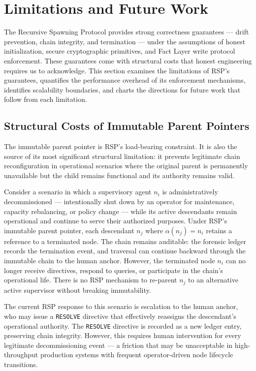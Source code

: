 \section{Limitations and Future Work}
\label{sec:rs-limitations}

The Recursive Spawning Protocol provides strong correctness guarantees — drift prevention, chain integrity, and termination — under the assumptions of honest initialization, secure cryptographic primitives, and Fact Layer write protocol enforcement. These guarantees come with structural costs that honest engineering requires us to acknowledge. This section examines the limitations of RSP's guarantees, quantifies the performance overhead of its enforcement mechanisms, identifies scalability boundaries, and charts the directions for future work that follow from each limitation.

\subsection{Structural Costs of Immutable Parent Pointers}
\label{sec:rs-limitations-immutability}

The immutable parent pointer is RSP's load-bearing constraint. It is also the source of its most significant structural limitation: it prevents legitimate chain reconfiguration in operational scenarios where the original parent is permanently unavailable but the child remains functional and its authority remains valid.

Consider a scenario in which a supervisory agent $n_i$ is administratively decommissioned — intentionally shut down by an operator for maintenance, capacity rebalancing, or policy change — while its active descendants remain operational and continue to serve their authorized purposes. Under RSP's immutable parent pointer, each descendant $n_j$ where $\alpha(n_j) = n_i$ retains a reference to a terminated node. The chain remains auditable: the forensic ledger records the termination event, and traversal can continue backward through the immutable chain to the human anchor. However, the terminated node $n_i$ can no longer receive directives, respond to queries, or participate in the chain's operational life. There is no RSP mechanism to re-parent $n_j$ to an alternative active supervisor without breaking immutability.

The current RSP response to this scenario is escalation to the human anchor, who may issue a \texttt{RESOLVE} directive that effectively reassigns the descendant's operational authority. The \texttt{RESOLVE} directive is recorded as a new ledger entry, preserving chain integrity. However, this requires human intervention for every legitimate decommissioning event — a friction that may be unacceptable in high-throughput production systems with frequent operator-driven node lifecycle transitions.

